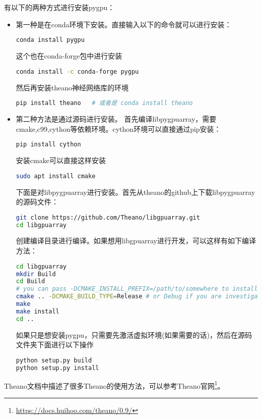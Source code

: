 \documentclass[lang=cn,a4paper,newtx]{elegantpaper}
\begin{document}
有以下的两种方式进行安装pygpu：
\begin{itemize}
  \item 第一种是在conda环境下安装。直接输入以下的命令就可以进行安装：
\begin{lstlisting}[language=bash]
conda install pygpu
\end{lstlisting}

  这个也在conda-forge包中进行安装
\begin{lstlisting}[language=bash]
conda install -c conda-forge pygpu
\end{lstlisting}
  
  然后再安装theano神经网络库的环境
\begin{lstlisting}[language=bash]
pip install theano   # 或者是 conda install theano
\end{lstlisting}
  \item 第二种方法是通过源码进行安装。
  首先编译libpygpuarray，需要cmake,c99,cython等依赖环境。cython环境可以直接通过pip安装：
\begin{lstlisting}[language=bash]
pip install cython
\end{lstlisting}
  安装cmake可以直接这样安装
\begin{lstlisting}[language=bash]
sudo apt install cmake
\end{lstlisting}
  
  下面是对libpygpuarray进行安装。首先从theano的github上下载libpygpuarray的源码文件：
  \begin{lstlisting}[language=bash]
git clone https://github.com/Theano/libgpuarray.git
cd libgpuarray
  \end{lstlisting}
  创建编译目录进行编译。如果想用libgpuarray进行开发，可以这样有如下编译方法：
\begin{lstlisting}[language=bash]
cd libgpuarray
mkdir Build
cd Build
# you can pass -DCMAKE_INSTALL_PREFIX=/path/to/somewhere to install to an alternate location
cmake .. -DCMAKE_BUILD_TYPE=Release # or Debug if you are investigating a crash
make
make install
cd ..
\end{lstlisting}
  如果只是想安装pygpu，只需要先激活虚拟环境(如果需要的话)，然后在源码文件夹下面进行以下操作
  \begin{lstlisting}[language=bash]
python setup.py build
python setup.py install
  \end{lstlisting}
\end{itemize}

Theano文档中描述了很多Theano的使用方法，可以参考Theano官网\footnote{\url{https://docs.huihoo.com/theano/0.9/}}。
\end{document}
